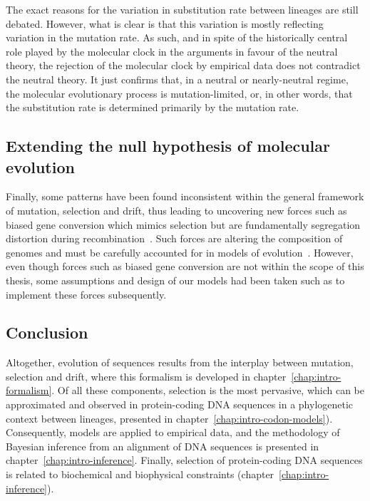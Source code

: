 The exact reasons for the variation in substitution rate between lineages are still debated.
However, what is clear is that this variation is mostly reflecting variation in the mutation rate.
As such, and in spite of the historically central role played by the molecular clock in the arguments in favour of the neutral theory, the rejection of the molecular clock by empirical data does not contradict the neutral theory.
It just confirms that, in a neutral or nearly-neutral regime, the molecular evolutionary process is mutation-limited, or, in other words, that the substitution rate is determined primarily by the mutation rate.

\subsection{Extending the null hypothesis of molecular evolution}
\label{subsec:extending-the-null-hypothesis-of-molecular-evolution}

Finally, some patterns have been found inconsistent within the general framework of mutation, selection and drift, thus leading to uncovering new forces such as biased gene conversion which mimics selection but are fundamentally segregation distortion during recombination~\citep{Marais2003,Galtier2007,Duret2009}.
Such forces are altering the composition of genomes and must be carefully accounted for in models of evolution~\citep{Galtier2009,Ratnakumar2010, Figuet2014}.
However, even though forces such as biased gene conversion are not within the scope of this thesis, some assumptions and design of our models had been taken such as to implement these forces subsequently.

\subsection{Conclusion}
\label{subsec:conclusion}

Altogether, evolution of sequences results from the interplay between mutation, selection and drift, where this formalism is developed in chapter~\ref{chap:intro-formalism}.
Of all these components, selection is the most pervasive, which can be approximated and observed in protein-coding \acrshort{DNA} sequences in a phylogenetic context between lineages, presented in chapter~\ref{chap:intro-codon-models}).
Consequently, models are applied to empirical data, and the methodology of Bayesian inference from an alignment of \acrshort{DNA} sequences is presented in chapter~\ref{chap:intro-inference}.
Finally, selection of protein-coding \acrshort{DNA} sequences is related to biochemical and biophysical constraints (chapter~\ref{chap:intro-inference}).

